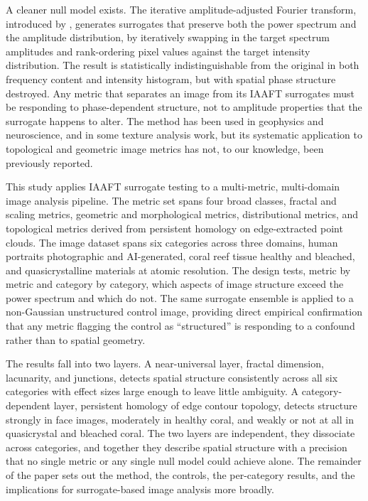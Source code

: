 \documentclass[a4paper,12pt]{article}
\begin{document}
A cleaner null model exists. The iterative amplitude-adjusted Fourier transform, introduced by \citet{schreiber1996}, generates surrogates that preserve both the power spectrum and the amplitude distribution, by iteratively swapping in the target spectrum amplitudes and rank-ordering pixel values against the target intensity distribution. The result is statistically indistinguishable from the original in both frequency content and intensity histogram, but with spatial phase structure destroyed. Any metric that separates an image from its IAAFT surrogates must be responding to phase-dependent structure, not to amplitude properties that the surrogate happens to alter. The method has been used in geophysics and neuroscience, and in some texture analysis work, but its systematic application to topological and geometric image metrics has not, to our knowledge, been previously reported.

This study applies IAAFT surrogate testing to a multi-metric, multi-domain image analysis pipeline. The metric set spans four broad classes, fractal and scaling metrics, geometric and morphological metrics, distributional metrics, and topological metrics derived from persistent homology on edge-extracted point clouds. The image dataset spans six categories across three domains, human portraits photographic and AI-generated, coral reef tissue healthy and bleached, and quasicrystalline materials at atomic resolution. The design tests, metric by metric and category by category, which aspects of image structure exceed the power spectrum and which do not. The same surrogate ensemble is applied to a non-Gaussian unstructured control image, providing direct empirical confirmation that any metric flagging the control as ``structured'' is responding to a confound rather than to spatial geometry.

The results fall into two layers. A near-universal layer, fractal dimension, lacunarity, and junctions, detects spatial structure consistently across all six categories with effect sizes large enough to leave little ambiguity. A category-dependent layer, persistent homology of edge contour topology, detects structure strongly in face images, moderately in healthy coral, and weakly or not at all in quasicrystal and bleached coral. The two layers are independent, they dissociate across categories, and together they describe spatial structure with a precision that no single metric or any single null model could achieve alone. The remainder of the paper sets out the method, the controls, the per-category results, and the implications for surrogate-based image analysis more broadly.
\end{document}
